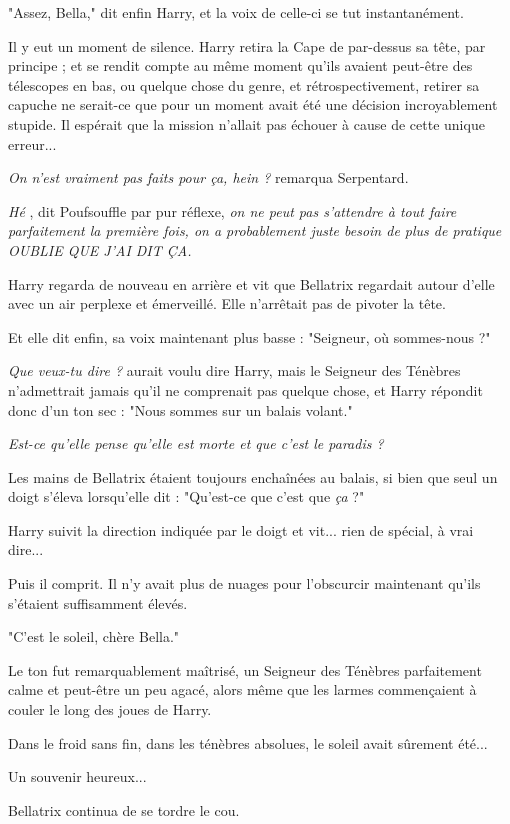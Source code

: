 "Assez, Bella," dit enfin Harry, et la voix de celle-ci se tut instantanément.

Il y eut un moment de silence. Harry retira la Cape de par-dessus sa tête, par principe ; et se rendit compte au même moment qu'ils avaient peut-être des télescopes en bas, ou quelque chose du genre, et rétrospectivement, retirer sa capuche ne serait-ce que pour un moment avait été une décision incroyablement stupide. Il espérait que la mission n'allait pas échouer à cause de cette unique erreur...

\emph{On n'est vraiment pas faits pour ça, hein ?}  remarqua Serpentard.

\emph{Hé} , dit Poufsouffle par pur réflexe, \emph{on ne peut pas s'attendre à tout faire parfaitement la première fois, on a probablement juste besoin de plus de pratique OUBLIE QUE J'AI DIT ÇA.} 

Harry regarda de nouveau en arrière et vit que Bellatrix regardait autour d'elle avec un air perplexe et émerveillé. Elle n'arrêtait pas de pivoter la tête.

Et elle dit enfin, sa voix maintenant plus basse : "Seigneur, où sommes-nous ?"

\emph{Que veux-tu dire ?}  aurait voulu dire Harry, mais le Seigneur des Ténèbres n'admettrait jamais qu'il ne comprenait pas quelque chose, et Harry répondit donc d'un ton sec : "Nous sommes sur un balais volant."

\emph{Est-ce qu'elle pense qu'elle est morte et que c'est le paradis ?} 

Les mains de Bellatrix étaient toujours enchaînées au balais, si bien que seul un doigt s'éleva lorsqu'elle dit : "Qu'est-ce que c'est que \emph{ça}  ?"

Harry suivit la direction indiquée par le doigt et vit... rien de spécial, à vrai dire...

Puis il comprit. Il n'y avait plus de nuages pour l'obscurcir maintenant qu'ils s'étaient suffisamment élevés.

"C'est le soleil, chère Bella."

Le ton fut remarquablement maîtrisé, un Seigneur des Ténèbres parfaitement calme et peut-être un peu agacé, alors même que les larmes commençaient à couler le long des joues de Harry.

Dans le froid sans fin, dans les ténèbres absolues, le soleil avait sûrement été...

Un souvenir heureux...

Bellatrix continua de se tordre le cou.

